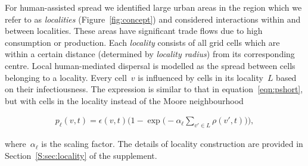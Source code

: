 \documentclass[11pt]{article}
\newcommand{\infest}{\rho}
\newcommand{\suitable}{\epsilon}
\newcommand{\plocal}{p_{\ell}}
\newcommand{\afm}{\alpha_{\ell}}
\newcommand{\locality}{{L}}
\theoremstyle{definition}
\begin{document}
For human-assisted spread we identified large urban areas in the region
which we refer to as {\it localities} (Figure~\ref{fig:concept}) and
considered interactions within and between localities. These areas have
significant trade flows due to high consumption or production. Each
\emph{locality} consists of all grid cells which are within a certain
distance (determined by \emph{locality radius}) from its corresponding
centre. Local human-mediated dispersal is modelled as the spread between
cells belonging to a locality.  Every cell~$v$ is influenced by cells in
its locality~$\locality$ based on their infectiousness.  The expression is
similar to that in equation~\eqref{eqn:pshort}, but with cells in the locality
instead of the Moore neighbourhood
\begin{linenomath}
\begin{align}\label{eqn:plocal}
    \plocal(v,t)=\suitable(v,t)\bigg(1-
    \exp\Big(-\afm\sum_{v'\in\locality}\infest(v',t)\Big)\bigg),
\end{align}
\end{linenomath}
where~$\afm$ is the scaling factor. The details of locality construction
are provided in Section~\ref{S:sec:locality} of the supplement.
\end{document}
